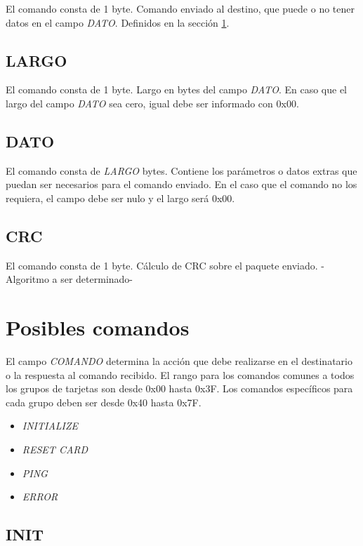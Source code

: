 \documentclass[a4paper,10pt]{article}
\begin{document}
	El comando consta de 1 byte.
	Comando enviado al destino, que puede o no tener datos en el campo \emph{DATO}.
	Definidos en la secci\'on \ref{comandos}.

\subsection{LARGO}
\label{largo}

	El comando consta de 1 byte.
	Largo en bytes del campo \emph{DATO}.
	En caso que el largo del campo \emph{DATO} sea cero, igual debe ser informado con 0x00.

\subsection{DATO}
\label{dato}

	El comando consta de \emph{LARGO} bytes.
	Contiene los par\'ametros o datos extras que puedan ser necesarios para el comando enviado.
	En el caso que el comando no los requiera, el campo debe ser nulo y el largo ser\'a 0x00.

\subsection{CRC}
\label{crc}

	El comando consta de 1 byte.
	C\'alculo de CRC sobre el paquete enviado.
	-Algoritmo a ser determinado-

\section{Posibles comandos}
\label{comandos}

El campo \emph{COMANDO} determina la acci\'on que debe realizarse en el destinatario o la respuesta al comando recibido.
El rango para los comandos comunes a todos los grupos de tarjetas son desde 0x00 hasta 0x3F.
Los comandos espec\'ificos para cada grupo deben ser desde 0x40 hasta 0x7F.

\begin{itemize}
	\item \emph{INITIALIZE}
	\item \emph{RESET CARD}
	\item \emph{PING}
	\item \emph{ERROR}
\label{lista_comandos}
\end{itemize}

\subsection{INIT}
\label{init}
\end{document}
